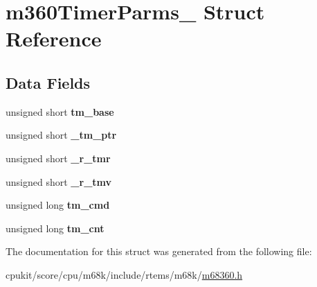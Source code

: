 \hypertarget{structm360TimerParms__}{}\section{m360\+Timer\+Parms\+\_\+ Struct Reference}
\label{structm360TimerParms__}
\subsection*{Data Fields}
\begin{DoxyCompactItemize}
\item 
\mbox{\label{structm360TimerParms___ac0b7d7e994a59a6c25de5781f6bf472c}} 
unsigned short {\bfseries tm\+\_\+base}
\item 
\mbox{\label{structm360TimerParms___a51682d97e14045bf75e6d8efd4476240}} 
unsigned short {\bfseries \+\_\+tm\+\_\+ptr}
\item 
\mbox{\label{structm360TimerParms___a9ea2c412959cebcd5de9b55ebe099b1a}} 
unsigned short {\bfseries \+\_\+r\+\_\+tmr}
\item 
\mbox{\label{structm360TimerParms___a012d4ca9812558c59f70c29308cee25b}} 
unsigned short {\bfseries \+\_\+r\+\_\+tmv}
\item 
\mbox{\label{structm360TimerParms___a64b535c4562ee5e314fda26cebf61b7d}} 
unsigned long {\bfseries tm\+\_\+cmd}
\item 
\mbox{\label{structm360TimerParms___a59a35ae49d1d554d3b675093665af1a7}} 
unsigned long {\bfseries tm\+\_\+cnt}
\end{DoxyCompactItemize}


The documentation for this struct was generated from the following file\+:\begin{DoxyCompactItemize}
\item 
cpukit/score/cpu/m68k/include/rtems/m68k/\mbox{\hyperlink{m68360_8h}{m68360.\+h}}\end{DoxyCompactItemize}
